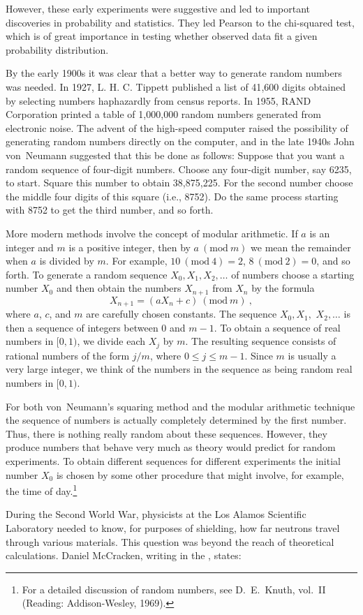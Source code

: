 However, these early experiments were suggestive and led to important
discoveries in probability and statistics.  They led Pearson to the \emx
{chi-squared test,} which is of great importance in testing whether observed
data fit a given probability distribution.

By the early 1900s it was clear that a better way to generate random numbers
was needed.  In 1927, L. H. C. Tippett published a list of 41{,}600 digits
obtained by selecting numbers haphazardly from census reports.  In 1955, RAND
Corporation printed a table of 1{,}000{,}000 random numbers generated from
electronic noise.  The advent of the high-speed computer raised the
possibility
of generating random numbers directly on the computer, and in the late 1940s
John von~Neumann suggested that this be done as follows: Suppose that you
want
a random sequence of four-digit numbers.  Choose any four-digit number, say
6235, to start.  Square this number to obtain 38{,}875{,}225.  For the second
number choose the middle four digits of this square (i.e., 8752).  Do the
same process starting with 8752 to get the third number, and so forth.  
\par
More modern methods involve the
concept of modular arithmetic.  
If $a$ is an integer and $m$ is a positive integer, then by
$a\ (\mbox{mod}\  m)$
we mean the remainder when $a$ is divided by $m$.  For example, $10\ (
\mbox{mod}\  4) = 2$,
$8\ (\mbox{mod}\  2) = 0$, and so forth.  To generate a random sequence $X_0,
X_1, X_2,
\dots$ of numbers choose a starting number $X_0$ and then obtain the numbers
$X_{n+1}$ from $X_n$ by the formula 
$$X_{n+1} = (aX_n + c)\ (\mbox{mod}\ m)\ ,$$
where $a$, $c$, and $m$ are carefully chosen constants.  The sequence 
$ X_0,  X_1,$ 
$X_2, \dots$ 
is then a sequence of integers between 0 and $m-1$.  To obtain a sequence of real numbers in $[0,1)$,
we divide each $X_j$ by $m$.  The resulting sequence consists of rational numbers of the form $j/m$,
where $0 \le j \le m-1$.  Since $m$ is usually a very large integer, we think of the numbers in the sequence
as being random real numbers in $[0, 1)$.
\par
For both von~Neumann's squaring method and the modular arithmetic technique the sequence
of numbers is actually completely determined by the first number.  Thus,
there is nothing really random about these sequences.  However, they produce
numbers that behave very much as theory would predict for random experiments.  To
obtain different sequences for different experiments the initial number $X_0$
is chosen by some other procedure that might involve, for example, the time
of day.\footnote{For a detailed discussion of random numbers, see D.~E.~Knuth,  vol.~II (Reading: Addison-Wesley, 1969).}
\par
During the Second World War, physicists at the Los Alamos Scientific
Laboratory
needed to know, for purposes of shielding, how far neutrons travel through
various materials.  This question was beyond the reach of theoretical
calculations.  Daniel McCracken, writing in the ,
states:

